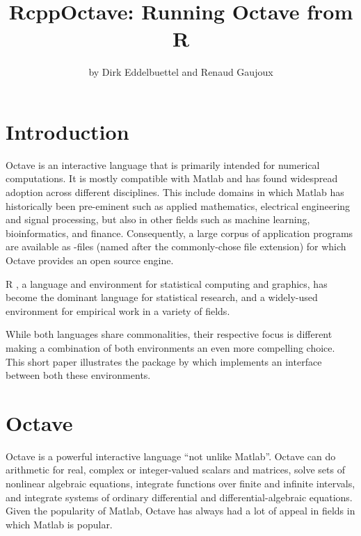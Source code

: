 


\title{RcppOctave: Running Octave from R}
\author{by Dirk Eddelbuettel and Renaud Gaujoux}

\maketitle


\section{Introduction}

Octave \citep{Eaton:2008} is an interactive language that is primarily
intended for numerical computations. It is mostly compatible with Matlab
\citep{MATLAB:2010} and has found widespread adoption across different
disciplines. This include domains in which Matlab has historically been
pre-eminent such as applied mathematics, electrical engineering and signal
processing, but also in other fields such as machine learning,
bioinformatics, and finance.  Consequently, a large corpus of application
programs are available as -files (named after the commonly-chose
file extension) for which Octave provides an open source engine.

R \citep{R:2012}, a language and environment for statistical
computing and graphics, has become the dominant language for statistical
research, and a widely-used environment for empirical work in a variety of
fields.

While both languages share commonalities, their respective focus is different
making a combination of both environments an even more compelling choice.
This short paper illustrates the  package by
\cite{CRAN:RcppOctave} which implements an interface between both these
environments.

\section{Octave}

Octave \citep{Eaton:2008} is a powerful interactive language ``not unlike
Matlab''. Octave can do arithmetic for real, complex or integer-valued
scalars and matrices, solve sets of nonlinear algebraic equations, integrate
functions over finite and infinite intervals, and integrate systems of
ordinary differential and differential-algebraic equations.  Given the
popularity of Matlab, Octave has always had a lot of appeal in fields in
which Matlab is popular.

